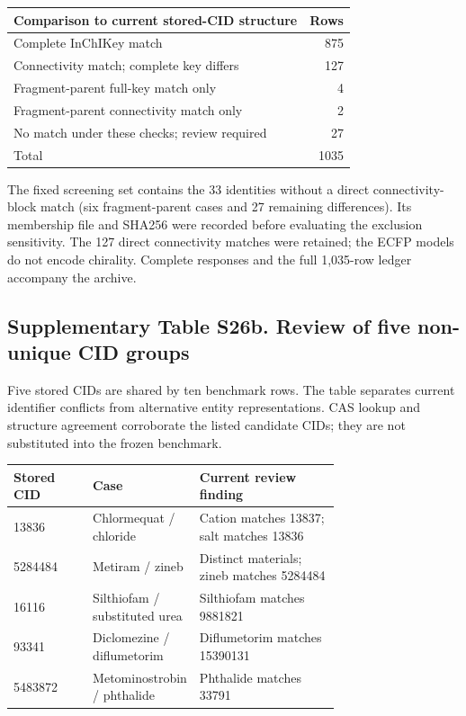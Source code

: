 \begin{center}
\small
\begin{tabular}{lr}
\toprule
Comparison to current stored-CID structure & Rows \\
\midrule
Complete InChIKey match & 875 \\
Connectivity match; complete key differs & 127 \\
Fragment-parent full-key match only & 4 \\
Fragment-parent connectivity match only & 2 \\
No match under these checks; review required & 27 \\
Total & 1035 \\
\bottomrule
\end{tabular}
\end{center}

The fixed screening set contains the 33 identities without a
direct connectivity-block match (six fragment-parent cases and 27 remaining
differences). Its membership file and SHA256 were recorded before evaluating
the exclusion sensitivity. The 127 direct connectivity matches were retained;
the ECFP models do not encode chirality. Complete responses and the full 1,035-row
ledger accompany the archive.

\subsection*{Supplementary Table S26b. Review of five non-unique CID groups}

Five stored CIDs are shared by ten benchmark rows. The table separates
current identifier conflicts from alternative entity representations. CAS lookup
and structure agreement corroborate the listed candidate CIDs; they are not
substituted into the frozen benchmark.

\begin{center}
\small
\begin{tabular}{lp{0.29\linewidth}p{0.43\linewidth}}
\toprule
Stored CID & Case & Current review finding \\
\midrule
13836 & Chlormequat / chloride & Cation matches 13837; salt matches 13836 \\
5284484 & Metiram / zineb & Distinct materials; zineb matches 5284484 \\
16116 & Silthiofam / substituted urea & Silthiofam matches 9881821 \\
93341 & Diclomezine / diflumetorim & Diflumetorim matches 15390131 \\
5483872 & Metominostrobin / phthalide & Phthalide matches 33791 \\
\bottomrule
\end{tabular}
\end{center}

